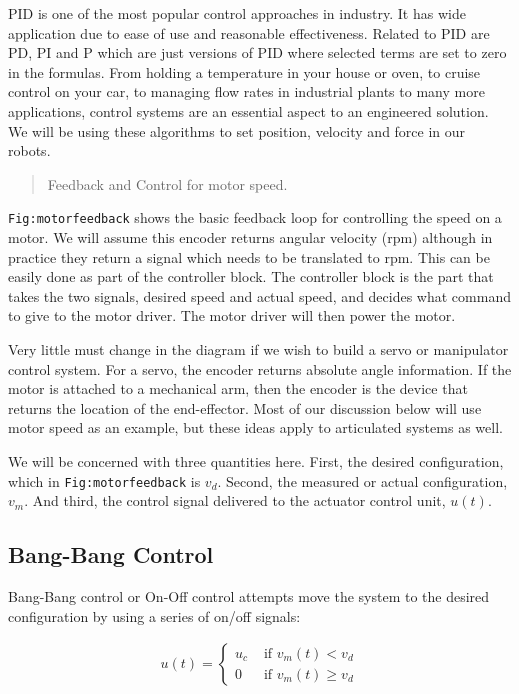 PID is one of the most popular control approaches in industry. It has
wide application due to ease of use and reasonable effectiveness.
Related to PID are PD, PI and P which are just versions of PID where
selected terms are set to zero in the formulas. From holding a
temperature in your house or oven, to cruise control on your car, to
managing flow rates in industrial plants to many more applications,
control systems are an essential aspect to an engineered solution. We
will be using these algorithms to set position, velocity and force in
our robots.

\begin{quote}
Feedback and Control for motor speed.
\end{quote}

\texttt{Fig:motorfeedback} shows the basic feedback loop for controlling
the speed on a motor. We will assume this encoder returns angular
velocity (rpm) although in practice they return a signal which needs to
be translated to rpm. This can be easily done as part of the controller
block. The controller block is the part that takes the two signals,
desired speed and actual speed, and decides what command to give to the
motor driver. The motor driver will then power the motor.

Very little must change in the diagram if we wish to build a servo or
manipulator control system. For a servo, the encoder returns absolute
angle information. If the motor is attached to a mechanical arm, then
the encoder is the device that returns the location of the end-effector.
Most of our discussion below will use motor speed as an example, but
these ideas apply to articulated systems as well.

We will be concerned with three quantities here. First, the desired
configuration, which in \texttt{Fig:motorfeedback} is \(v_d\). Second,
the measured or actual configuration, \(v_m\). And third, the control
signal delivered to the actuator control unit, \(u(t)\).

\hypertarget{bang-bang-control}{%
\subsection{Bang-Bang Control}\label{bang-bang-control}}

Bang-Bang control or On-Off control attempts move the system to the
desired configuration by using a series of on/off signals:

\[\begin{aligned}
u(t) = \left\{ \begin{array}{lr} u_c & \mbox{~if~} v_m(t) < v_d \\  0 & \mbox{~if~} v_m(t)\geq v_d \end{array} \right.
\end{aligned}\]

